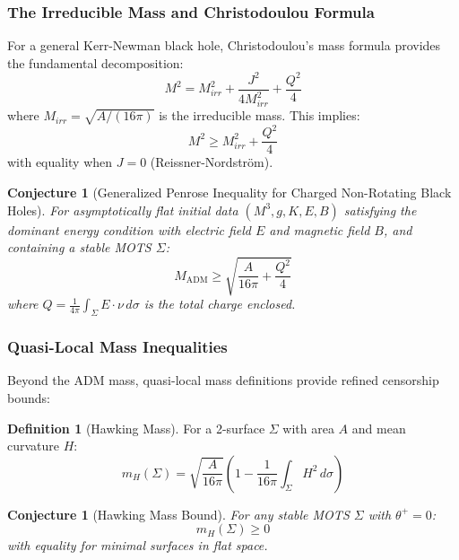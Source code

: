 \documentclass[12pt]{article}
\theoremstyle{plain}
\newtheorem{conjecture}[theorem]{Conjecture}
\theoremstyle{definition}
\newtheorem{definition}[theorem]{Definition}
\theoremstyle{remark}
\newcommand{\ADM}{\mathrm{ADM}}
\begin{document}
\subsubsection{The Irreducible Mass and Christodoulou Formula}

For a general Kerr-Newman black hole, Christodoulou's mass formula provides the fundamental decomposition:
\begin{equation}\label{eq:christodoulou}
M^2 = M_{irr}^2 + \frac{J^2}{4M_{irr}^2} + \frac{Q^2}{4}
\end{equation}
where $M_{irr} = \sqrt{A/(16\pi)}$ is the irreducible mass. This implies:
\begin{equation}\label{eq:christodoulou-bound}
M^2 \geq M_{irr}^2 + \frac{Q^2}{4}
\end{equation}
with equality when $J = 0$ (Reissner-Nordstr\"om).

\begin{conjecture}[Generalized Penrose Inequality for Charged Non-Rotating Black Holes]
For asymptotically flat initial data $(M^3, g, K, E, B)$ satisfying the dominant energy condition with electric field $E$ and magnetic field $B$, and containing a stable MOTS $\Sigma$:
\begin{equation}
M_{\ADM} \geq \sqrt{\frac{A}{16\pi} + \frac{Q^2}{4}}
\end{equation}
where $Q = \frac{1}{4\pi}\int_\Sigma E \cdot \nu \, d\sigma$ is the total charge enclosed.
\end{conjecture}

\subsubsection{Quasi-Local Mass Inequalities}

Beyond the ADM mass, quasi-local mass definitions provide refined censorship bounds:

\begin{definition}[Hawking Mass]
For a 2-surface $\Sigma$ with area $A$ and mean curvature $H$:
\begin{equation}
m_H(\Sigma) = \sqrt{\frac{A}{16\pi}}\left(1 - \frac{1}{16\pi}\int_\Sigma H^2 \, d\sigma\right)
\end{equation}
\end{definition}

\begin{conjecture}[Hawking Mass Bound]
For any stable MOTS $\Sigma$ with $\theta^+ = 0$:
\begin{equation}
m_H(\Sigma) \geq 0
\end{equation}
with equality for minimal surfaces in flat space.
\end{conjecture}
\end{document}
